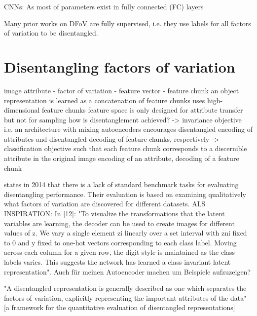 \documentclass[10pt,letterpaper]{article}
\begin{document}
\par CNNs: As most of parameters exist in fully connected (FC) layers

\par Many prior works on DFoV are fully supervised, i.e. they use labels for all factors of variation to be disentangled.

\section{Disentangling factors of variation}
image attribute - factor of variation - feature vector - feature chunk
an object representation is learned as a concatenation of feature chunks
uses high-dimensional feature chunks
feature space is only designed for attribute transfer but not for sampling
how is disentanglement achieved? 
-> invariance objective i.e. an architecture with mixing autoencoders encourages disentangled encoding of attributes and disentangled decoding of feature chunks, respectively
-> classification objective such that each feature chunk corresponds to a discernible attribute in the original image 
encoding of an attribute, decoding of a feature chunk

\par\cite{1412.6583} states in 2014 that there is a lack of standard benchmark tasks for evaluating disentangling performance. Their evaluation is based on examining qualitatively what factors of variation are discovered for different datasets. ALS INSPIRATION: In [12]: "To visualize the transformations that the latent variables are learning, the decoder can be used to create images for different values of z. We vary a single element zi linearly over a set interval with zni fixed to 0 and y fixed to one-hot vectors corresponding to each class label. Moving across each column for a given row, the digit style is maintained as the class labels varies. This suggests the network has learned a class invariant latent representation". Auch für meinen Autoencoder machen um Beispiele aufzuzeigen?

\par "A disentangled representation is generally described as one which separates the factors of variation, explicitly representing the important attributes of the data" [a framework for the quantitative evaluation of disentangled representations]
\end{document}
